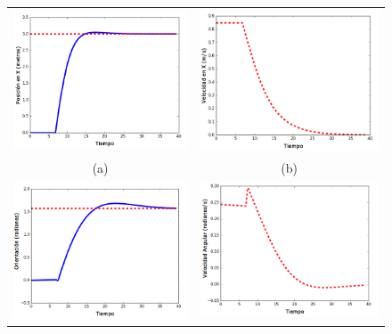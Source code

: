 \begin{figure}[ht!]
  \begin{tabular}{cc}
    \includegraphics[width=.47\textwidth]{images/PosicionEnX_tesis.PNG}&
    \includegraphics[width=.47\textwidth]{images/velocidadEnX_tesis.PNG}\\
    (a)&(b)\\
    \includegraphics[width=.47\textwidth]{images/orientacion_tesis.PNG}&
    \includegraphics[width=.47\textwidth]{images/velocidadAngular_tesis.PNG}\\

\end{tabular}
\end{figure}
